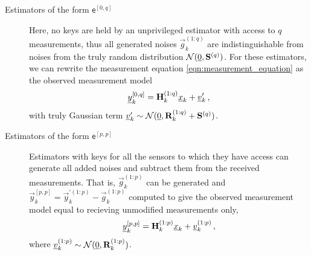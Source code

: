 \begin{description}
  \item[Estimators of the form $\mathsf{e}^{[0,q]}$] Here, no keys are held by an unprivileged estimator with access to $q$ measurements, thus all generated noises $\vec{g}_k^{(1:q)}$ are indistinguishable from noises from the truly random distribution $\mathcal{N}({\underline{0}}, {{\mathbf{S}}}^{(q)})$. For these estimators, we can rewrite the measurement equation \eqref{eqn:measurement_equation} as the observed measurement model
  \begin{equation}\label{eqn:0q_obs_measurement_model}
    {\underline{y}}_k^{[0,q]} = {{\mathbf{H}}}_k^{(1:q)}{\underline{x}}_k + {\underline{v}}_k^{\prime}\,,
  \end{equation}
  with truly Gaussian term ${\underline{v}}_k^{\prime} \sim \mathcal{N}({\underline{0}}, {{\mathbf{R}}}_k^{(1:q)}+{{\mathbf{S}}}^{(q)})$.
  
  \item[Estimators of the form $\mathsf{e}^{[p,p]}$] Estimators with keys for all the sensors to which they have access can generate all added noises and subtract them from the received measurements. That is, $\vec{g}_k^{(1:p)}$ can be generated and $\vec{y}_k^{[p,p]}=\vec{y}_k^{\prime(1:p)}-\vec{g}_k^{(1:p)}$ computed to give the observed measurement model equal to recieving unmodified measurements only,
  \begin{equation}\label{eqn:pp_obs_measurement_model}
    {\underline{y}}_k^{[p,p]} = {{\mathbf{H}}}_k^{(1:p)}{\underline{x}}_k + {\underline{v}}_k^{(1:p)}\,,
  \end{equation}
  where ${\underline{v}}_k^{(1:p)} \sim \mathcal{N}({\underline{0}}, {{\mathbf{R}}}_k^{(1:p)})$.


\end{description}
